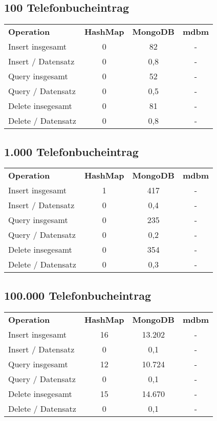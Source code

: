 \documentclass[a4paper]{scrartcl}
\begin{document}
\subsection*{100 Telefonbucheintrag} 
\begin{tabular}{lccc}
\textbf{Operation} & \textbf{HashMap}  & \textbf{MongoDB}  & \textbf{mdbm} 	\\
Insert insgesamt &  0 & 82  & - \\
Insert / Datensatz & 0 & 0,8 & - \\
Query insgesamt & 0 & 52 & - \\
Query / Datensatz & 0 & 0,5 & - \\
Delete insegesamt & 0 & 81 & - \\
Delete / Datensatz & 0 & 0,8 & -
\end{tabular}

\subsection*{1.000 Telefonbucheintrag} 
\begin{tabular}{lccc}
\textbf{Operation} & \textbf{HashMap}  & \textbf{MongoDB}  & \textbf{mdbm} 	\\
Insert insgesamt &  1 & 417  & - \\
Insert / Datensatz & 0 & 0,4 & - \\
Query insgesamt & 0 & 235 & - \\
Query / Datensatz & 0 & 0,2 & - \\
Delete insegesamt & 0 & 354 & - \\
Delete / Datensatz & 0 & 0,3 & -
\end{tabular}

\subsection*{100.000 Telefonbucheintrag} 
\begin{tabular}{lccc}
\textbf{Operation} & \textbf{HashMap}  & \textbf{MongoDB}  & \textbf{mdbm} 	\\
Insert insgesamt &  16 & 13.202   & - \\
Insert / Datensatz & 0 & 0,1 & - \\
Query insgesamt & 12 & 10.724  & - \\
Query / Datensatz & 0 & 0,1 & - \\
Delete insegesamt & 15 & 14.670  & - \\
Delete / Datensatz & 0 & 0,1 & -
\end{tabular}
\end{document}
